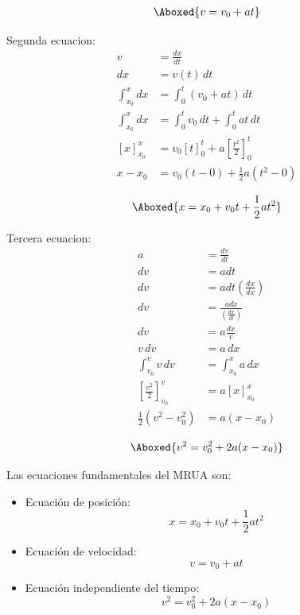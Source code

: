\vspace{-30pt}

\begin{align*}
    \Aboxed{v = v_0 + at}
\end{align*}

Segunda ecuacion:
\begin{align*}
v &= \frac{dx}{dt}\\
dx &= v(t)\,dt\\
\int_{x_0}^{x} dx &= \int_{0}^{t} (v_0 + at)\,dt\\
\int_{x_0}^{x} dx &= \int_{0}^{t} v_0\,dt + \int_{0}^{t} at\,dt\\
\left[x\right]_{x_0}^{x} &= v_0\left[t\right]_{0}^{t} + a\left[\frac{t^2}{2}\right]_{0}^{t}\\
x - x_0 &= v_0(t-0) + \frac{1}{2}a(t^2-0)
\end{align*}

\vspace{-20pt}

\begin{align*}
    \Aboxed{x = x_0 + v_0 t + \frac{1}{2}at^2}
\end{align*}

Tercera ecuacion:
\begin{align*}
a &= \frac{dv}{dt}\\
dv &= a dt\\
dv &= a dt(\frac{dx}{dx})\\
dv &= \frac{a dx}{(\frac{dx}{dt})}\\
dv &= a\frac{dx}{v}\\
v\,dv &= a\,dx\\
\int_{v_0}^{v} v\,dv &= \int_{x_0}^{x} a\,dx\\
\left[\frac{v^2}{2}\right]_{v_0}^{v} &= a\left[x\right]_{x_0}^{x}\\
\frac{1}{2}(v^2 - v_0^2) &= a(x - x_0)
\end{align*}

\vspace{-30pt}

\begin{align*}
    \Aboxed{v^2 = v_0^2 + 2a(x - x_0)}
\end{align*}

Las ecuaciones fundamentales del MRUA son:

\begin{itemize}
    \item Ecuación de posición:
    \[
    x = x_0 + v_0 t + \frac{1}{2}at^2
    \]

    \item Ecuación de velocidad:
    \[
    v = v_0 + at
    \]

    \item Ecuación independiente del tiempo:
    \[
    v^2 = v_0^2 + 2a(x - x_0)
    \]
\end{itemize}

